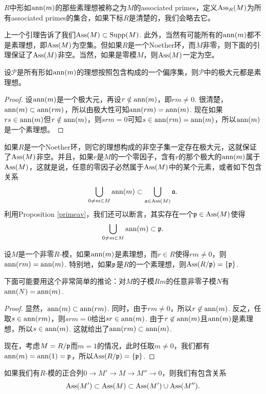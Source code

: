 \para $R$中形如$\operatorname{ann}(m)$的那些素理想被称之为$M$的associated primes，定义$\operatorname{Ass}_R(M)$为所有associated primes的集合，如果下标$R$是清楚的，我们会略去它。
\endpara

上一个引理告诉了我们$\operatorname{Ass}(M)\subset \operatorname{Supp}(M)$. 此外，当然有可能所有的$\operatorname{ann}(m)$都不是素理想，即$\operatorname{Ass}(M)$为空集。但如果$R$是一个Noether环，而$M$非零，则下面的引理保证了$\operatorname{Ass}(M)$非空。当然，如果是零模$M$，则$\operatorname{Ass}(M)$一定为空。

\begin{lem}
设$\mathcal{P}$是所有形如$\operatorname{ann}(m)$的理想按照包含构成的一个偏序集，则$\mathcal{P}$中的极大元都是素理想。
\end{lem}

\begin{proof}
	设$\operatorname{ann}(m)$是一个极大元，再设$r\notin \operatorname{ann}(m)$，即$rm\neq 0$. 很清楚，$\operatorname{ann}(m)\subset \operatorname{ann}(rm)$，所以由极大性可知$\operatorname{ann}(rm)=\operatorname{ann}(m)$. 现在如果$rs\in \operatorname{ann}(m)$但$r\notin \operatorname{ann}(m)$，则$srm=0$可知$s\in \operatorname{ann}(rm)=\operatorname{ann}(m)$，所以$\operatorname{ann}(m)$是一个素理想。
\end{proof}

如果$R$是一个Noether环，则它的理想构成的非空子集一定存在极大元，这就保证了$\operatorname{Ass}(M)$非空。并且，如果$r$是$M$的一个零因子，含有$r$的那个极大的$\operatorname{ann}(m)$属于$\operatorname{Ass}(M)$，这就是说，任意的零因子必然属于$\operatorname{Ass}(M)$中的某个元素，或者如下包含关系
\[
	\bigcup_{0\neq m\in M}\operatorname{ann}(m)\subset \bigcup_{\mathfrak{a}\in \operatorname{Ass}(M)}\mathfrak{a}. 
\]
利用Proposition \ref{primeav}，我们还可以断言，其实存在一个$\mathfrak{p}\in \operatorname{Ass}(M)$使得
\[
	\bigcup_{0\neq m\in M}\operatorname{ann}(m)\subset \mathfrak{p}.
\]

\begin{lem}
设$M$是一个非零$R$-模，如果$\operatorname{ann}(m)$是素理想，而$r\in R$使得$rm\neq 0$，则$\operatorname{ann}(rm)=\operatorname{ann}(m)$. 特别地，如果$\mathfrak{p}$是$R$的一个素理想，则$\operatorname{Ass}(R/\mathfrak{p})=\{\mathfrak{p}\}$.
\end{lem}

下面可能要用这个非常简单的推论：对$M$的子模$Rm$的任意非零子模$N$有$\operatorname{ann}(N)=\operatorname{ann}(m)$.

\begin{proof}
	显然，$\operatorname{ann}(m)\subset \operatorname{ann}(rm)$. 同时，由于$rm\neq 0$，所以$r\not\in \operatorname{ann}(m)$. 反之，任取$s\in \operatorname{ann}(rm)$，则$srm=0$给出$sr\in \operatorname{ann}(m)$. 由于$r\not\in \operatorname{ann}(m)$且$\operatorname{ann}(m)$是素理想，所以$s\in \operatorname{ann}(m)$. 这就给出了$\operatorname{ann}(rm)\subset \operatorname{ann}(m)$.

	现在，考虑$M=R/\mathfrak{p}$而$m=1$的情况，此时任取$m\neq 0$，我们都有$\operatorname{ann}(m)=\operatorname{ann}(1)=\mathfrak{p}$，所以$\operatorname{Ass}(R/\mathfrak{p})=\{\mathfrak{p}\}$.
\end{proof}

\begin{pro}
如果我们有$R$-模的正合列$0\to M'\to M\to M''\to 0$，则我们有包含关系
\[
	\operatorname{Ass}(M')\subset \operatorname{Ass}(M)\subset \operatorname{Ass}(M')\cup \operatorname{Ass}(M'').
\]
\end{pro}

